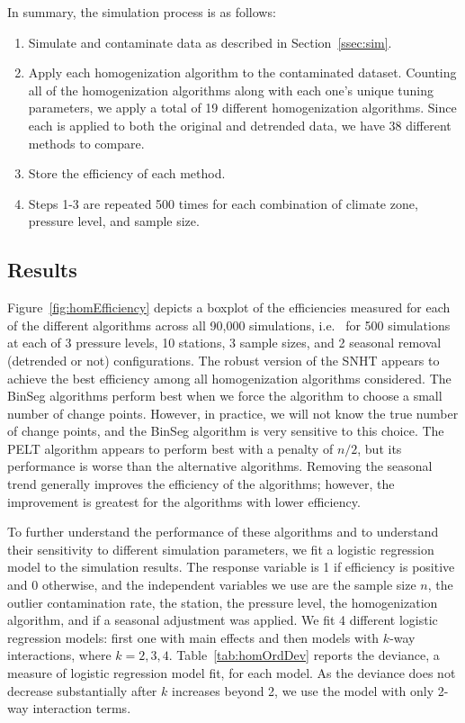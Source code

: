 \documentclass[12pt]{article}
\begin{document}
\begin{doublespacing}
In summary, the simulation process is as follows:

\begin{enumerate}
	\item Simulate and contaminate data as described in Section~\ref{ssec:sim}.
	\item Apply each homogenization algorithm to the contaminated dataset.  Counting all of the homogenization algorithms along with each one's unique tuning parameters, we apply   a total of 19 different homogenization algorithms. Since each is applied to both the original and detrended data, we have 38 different methods to compare.
	\item Store the efficiency of each method.
	\item Steps 1-3 are repeated 500 times for each combination of climate zone, pressure level, and sample size.
\end{enumerate}

\subsection{Results}

\label{sec:HomResults}

Figure~\ref{fig:homEfficiency} depicts a boxplot of the efficiencies measured for each of the different algorithms across all 90,000 simulations, i.e.~ for 500 simulations at each of 3 pressure levels, 10 stations, 3 sample sizes, and 2 seasonal removal (detrended or not) configurations.  The robust version of the SNHT appears to achieve the best efficiency among all homogenization algorithms considered.  The BinSeg algorithms perform best when we force the algorithm to choose a small number of change points.  However, in practice, we will not know the true number of change points, and the BinSeg algorithm is very sensitive to this choice.  The PELT algorithm appears to perform best with a penalty of $n/2$, but its performance is  worse than the alternative algorithms.  Removing the seasonal trend generally improves the efficiency of the algorithms; however, the improvement is greatest for the algorithms with lower efficiency.

To further understand the performance of these algorithms and to understand their sensitivity to different simulation parameters, we fit a logistic regression model to the simulation results.  The response variable is 1 if efficiency is positive and 0 otherwise, and the independent variables we use are the sample size $n$, the outlier contamination rate, the station, the pressure level, the homogenization algorithm, and if a seasonal adjustment was applied.  We fit 4 different logistic regression models: first one with main effects and then models with $k$-way interactions, where $k=2,3,4$.  Table~\ref{tab:homOrdDev} reports the deviance, a measure of logistic regression model fit, for each model.  As the deviance does not decrease substantially after $k$ increases beyond 2, we use the model with only 2-way interaction terms.


\end{doublespacing}
\end{document}
